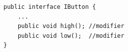 \begin{lstlisting}
public interface IButton {
	...
	public void high();	//modifier
	public void low();	//modifier
}
\end{lstlisting}







 



